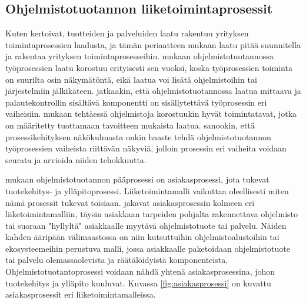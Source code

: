 \documentclass[finnish,12pt,a4paper,pdftex]{article}
\begin{document}
\subsection{Ohjelmistotuotannon liiketoimintaprosessit}

Kuten \cite{teollisuustalous} kertoivat, tuotteiden ja palveluiden laatu rakentuu yrityksen toimintaprosessien laadusta, ja tämän periaatteen mukaan laatu pitää suunnitella ja rakentaa yrityksen toimintaprosesseihin. \cite{ohjelmistotuotanto, devops} mukaan ohjelmistotuotannossa työprosessien laatu korostuu erityisesti sen vuoksi, koska työprosessien toiminta on suurilta osin näkymätöntä, eikä laatua voi lisätä ohjelmistoihin tai järjestelmiin jälkikäteen. \citeauthor{devops} jatkaakin, että ohjelmistotuotannossa laatua mittaava ja palautekontrollin sisältävä komponentti on sisällytettävä työprosessin eri vaiheisiin. \cite{okaytannot} mukaan tehtäessä ohjelmistoja korostuukin hyvät toimintatavat, jotka on määritetty tuottamaan tavoitteen mukaista laatua. \cite{ohjelmistotuotanto} sanookin, että prosessikehityksen näkökulmasta onkin haaste tehdä ohjelmistotuotannon työprosessien vaiheista riittävän näkyviä, jolloin prosessin eri vaiheita voidaan seurata ja arvioida niiden tehokkuutta.

\cite{ohjelmistotuotanto} mukaan ohjelmistotuotannon pääprosessi on asiakasprosessi, jota tukevat tuotekehitys- ja ylläpitoprosessi. Liiketoimintamalli vaikuttaa oleellisesti miten nämä prosessit tukevat toisiaan. \citeauthor{ohjelmistotuotanto} jakavat asiakasprosessin kolmeen eri liiketoimintamalliin, täysin asiakkaan tarpeiden pohjalta rakennettava ohjelmisto tai suoraan "hyllyltä" asiakkaalle myytävä ohjelmistotuote tai palvelu. Näiden kahden ääripään välimaastossa on niin kutsuttuihin ohjelmistoalustoihin tai ekosysteemeihin perustuva malli, jossa asiakkaalle paketoidaan ohjelmistotuote tai palvelu olemassaolevista ja räätälöidyistä komponenteista. Ohjelmistotuotantoprosessi voidaan nähdä yhtenä asiakasprosessina, johon tuotekehitys ja ylläpito kuuluvat. Kuvassa \ref{fig:asiakasprosessi} on kuvattu asiakasprosessit eri liiketoimintamalleissa.
\end{document}
